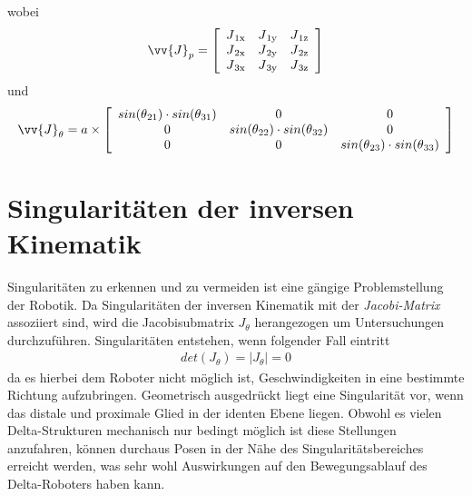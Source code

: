 \documentclass[Bachelor, BMR, ngerman]{twbook}
\begin{document}
    \noindent
    wobei
    \newline
    \begin{align}
        \vv{J}_p = 
            \left[
            \begin{array}{c c c} 
                J\textsubscript{1x} & J\textsubscript{1y} & J\textsubscript{1z}\\
                J\textsubscript{2x} & J\textsubscript{2y} & J\textsubscript{2z}\\
                J\textsubscript{3x} & J\textsubscript{3y} & J\textsubscript{3z}\\
            \end{array}
        \right]
        \label{eq:jp}
    \end{align}
    \noindent
    und
    \newline
    \begin{align}
        \vv{J}_\theta = a \times
            \left[
            \begin{array}{c c c} 
                sin(\theta\textsubscript{21}) \cdot sin(\theta\textsubscript{31}) & 0 & 0\\
                0 & sin(\theta\textsubscript{22}) \cdot sin(\theta\textsubscript{32}) & 0\\
                0 & 0 & sin(\theta\textsubscript{23}) \cdot sin(\theta\textsubscript{33})\\
            \end{array}
        \right]
        \label{eq:jtheta}
    \end{align}
    \noindent
    
    \section{Singularitäten der inversen Kinematik}
    
    Singularitäten zu erkennen und zu vermeiden ist eine gängige Problemstellung der Robotik. Da Singularitäten der inversen Kinematik mit der \textit{Jacobi-Matrix} assoziiert sind, wird die Jacobisubmatrix $J_\theta$ herangezogen um Untersuchungen durchzuführen. Singularitäten entstehen, wenn folgender Fall eintritt
    \newline
    \begin{align}
        det(J_\theta) = \vert J_\theta \vert = 0
        \label{eq:jtheta-determinante}
    \end{align}
    \noindent
    da es hierbei dem Roboter nicht möglich ist, Geschwindigkeiten in eine bestimmte Richtung aufzubringen. Geometrisch ausgedrückt liegt eine Singularität vor, wenn das distale und proximale Glied in der identen Ebene liegen. Obwohl es vielen Delta-Strukturen mechanisch nur bedingt möglich ist diese Stellungen anzufahren, können durchaus Posen in der Nähe des Singularitätsbereiches erreicht werden, was sehr wohl Auswirkungen auf den Bewegungsablauf des Delta-Roboters haben kann.
\end{document}
